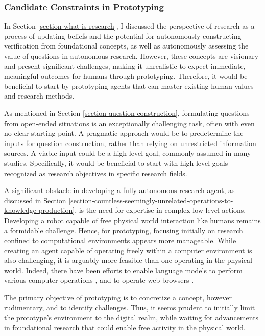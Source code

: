 \subsubsection{Candidate Constraints in Prototyping}

In Section \ref{section-what-is-research}, I discussed the perspective of research as a process of updating beliefs and the potential for autonomously constructing verification from foundational concepts, as well as autonomously assessing the value of questions in autonomous research. However, these concepts are visionary and present significant challenges, making it unrealistic to expect immediate, meaningful outcomes for humans through prototyping. Therefore, it would be beneficial to start by prototyping agents that can master existing human values and research methods.

As mentioned in Section \ref{section-question-construction}, formulating questions from open-ended situations is an exceptionally challenging task, often with even no clear starting point. A pragmatic approach would be to predetermine the inputs for question construction, rather than relying on unrestricted information sources. A viable input could be a high-level goal, commonly assumed in many studies. Specifically, it would be beneficial to start with high-level goals recognized as research objectives in specific research fields.

A significant obstacle in developing a fully autonomous research agent, as discussed in Section \ref{section-countless-seemingly-unrelated-operations-to-knowledge-production}, is the need for expertise in complex low-level actions. Developing a robot capable of free physical world interaction like humans remains a formidable challenge. Hence, for prototyping, focusing initially on research confined to computational environments appears more manageable. While creating an agent capable of operating freely within a computer environment is also challenging, it is arguably more feasible than one operating in the physical world. Indeed, there have been efforts to enable language models to perform various computer operations \cite{openinterpreter,openai_chatgpt_plugins_code_interpreter_2023}, and to operate web browsers \cite{nakano2021webgpt,act1}.

The primary objective of prototyping is to concretize a concept, however rudimentary, and to identify challenges. Thus, it seems prudent to initially limit the prototype's environment to the digital realm, while waiting for advancements in foundational research that could enable free activity in the physical world.

